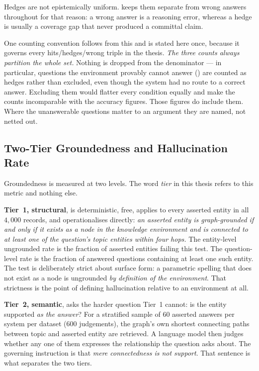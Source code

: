 Hedges are not epistemically uniform.  keeps them
separate from wrong answers throughout for that reason: a wrong answer is a
reasoning error, whereas a hedge is usually a coverage gap that never produced a
committal claim.

One counting convention follows from this and is stated here once, because it
governs every hits/hedges/wrong triple in the thesis. \emph{The three counts
always partition the whole set.} Nothing is dropped from the denominator --- in
particular, questions the environment provably cannot answer
() are counted as hedges rather than excluded, even
though the system had no route to a correct answer. Excluding them would flatter
every condition equally and make the counts incomparable with the accuracy
figures. Those figures do include them. Where the unanswerable questions matter
to an argument they are named, not netted out.

\subsection{Two-Tier Groundedness and Hallucination
Rate}\label{sec:groundedness-metric}

Groundedness is measured at two levels. The
word \emph{tier} in this thesis refers to this metric and
nothing else.

\textbf{Tier~1, structural}, is deterministic, free, applies to every asserted
entity in all $4{,}000$ records, and operationalises
 directly: \emph{an asserted entity is
graph-grounded if and only if it exists as a node in the knowledge environment
and is connected to at least one of the question's topic entities within four
hops.} The entity-level ungrounded rate is the fraction of asserted entities
failing this test. The question-level rate is the fraction of answered questions
containing at least one such entity. The test is deliberately strict about
surface form: a parametric spelling that does not exist as a node is
ungrounded \emph{by definition of the environment}. That strictness is the
point of defining hallucination relative to an environment at all.

\textbf{Tier~2, semantic}, asks the harder question Tier~1 cannot: is the entity
supported \emph{as the answer}? For a stratified sample of $60$ asserted answers
per system per dataset ($600$ judgements), the graph's own shortest connecting
paths between topic and asserted entity are retrieved. A language model then
judges whether any one of them expresses the relationship the question asks
about. The governing instruction is that \emph{mere connectedness is not
support}. That sentence is what separates the two tiers.

